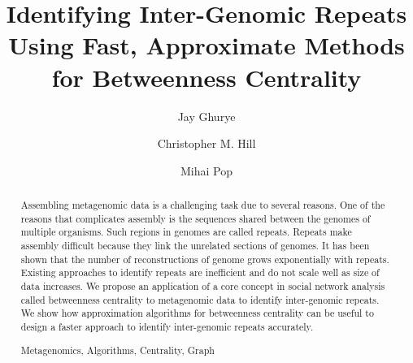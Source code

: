 \documentclass[runningheads,a4paper]{llncs}
\newcommand{\keywords}[1]{\par\addvspace\baselineskip
\noindent\keywordname\enspace\ignorespaces#1}
\begin{document}
\mainmatter  %

\title{Identifying Inter-Genomic Repeats Using Fast, Approximate Methods for Betweenness Centrality}


%
%
\author{Jay Ghurye%
\and Christopher M. Hill\and Mihai Pop}
%


%
%

\maketitle


\begin{abstract}
Assembling metagenomic data is a challenging task due to several reasons. One of the reasons that complicates assembly is the sequences shared between the genomes of multiple organisms. Such regions in genomes are called repeats. Repeats make assembly difficult because they link the unrelated sections of genomes. It has been shown that the number of reconstructions of genome grows exponentially with repeats. Existing approaches to identify repeats are inefficient and do not scale well as size of data increases. We propose an application of a core concept in social network analysis called betweenness centrality to metagenomic data to identify inter-genomic repeats. We show how approximation algorithms for betweenness centrality can be useful to design a faster approach to identify inter-genomic repeats accurately. 
\keywords{Metagenomics, Algorithms, Centrality, Graph}
\end{abstract}
\end{document}
